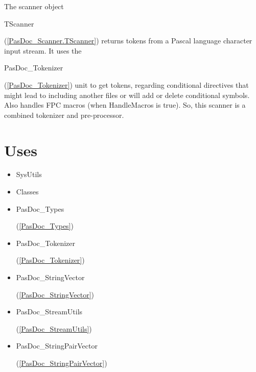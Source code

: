 \documentclass{report}
\begin{document}
    



The scanner object \begin{ttfamily}TScanner\end{ttfamily}(\ref{PasDoc_Scanner.TScanner}) returns tokens from a Pascal language character input stream. It uses the \begin{ttfamily}PasDoc{\_}Tokenizer\end{ttfamily}(\ref{PasDoc_Tokenizer}) unit to get tokens, regarding conditional directives that might lead to including another files or will add or delete conditional symbols. Also handles FPC macros (when HandleMacros is true). So, this scanner is a combined tokenizer and pre{-}processor.
\section{Uses}
\begin{itemize}
\item \begin{ttfamily}SysUtils\end{ttfamily}\item \begin{ttfamily}Classes\end{ttfamily}\item \begin{ttfamily}PasDoc{\_}Types\end{ttfamily}(\ref{PasDoc_Types})\item \begin{ttfamily}PasDoc{\_}Tokenizer\end{ttfamily}(\ref{PasDoc_Tokenizer})\item \begin{ttfamily}PasDoc{\_}StringVector\end{ttfamily}(\ref{PasDoc_StringVector})\item \begin{ttfamily}PasDoc{\_}StreamUtils\end{ttfamily}(\ref{PasDoc_StreamUtils})\item \begin{ttfamily}PasDoc{\_}StringPairVector\end{ttfamily}(\ref{PasDoc_StringPairVector})\end{itemize}
\end{document}
